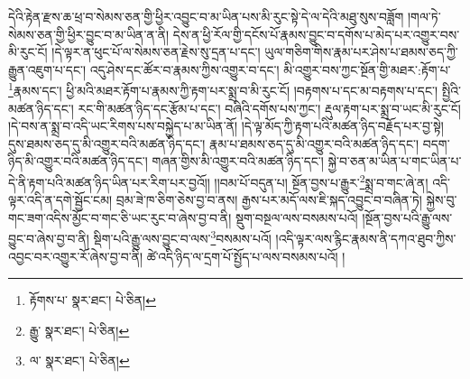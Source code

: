 དེའི་རྟེན་རྫས་ཆ་ཕྲ་བ་སེམས་ཅན་གྱི་ཕྱིར་འབྱུང་བ་མ་ཡིན་པས་མི་རུང་སྟེ་དེ་ལ་དེའི་མཐུ་སུས་བཟློག །གལ་ཏེ་སེམས་ཅན་གྱི་ཕྱིར་བྱུང་བ་མ་ཡིན་ན་ནི། དེས་ན་ཕྱི་རོལ་གྱི་དངོས་པོ་རྣམས་བྱུང་བ་དགོས་པ་མེད་པར་འགྱུར་བས་མི་རུང་ངོ། །དེ་ལྟར་ན་ཕུང་པོ་ལ་སེམས་ཅན་རྗེས་སུ་དྲན་པ་དང་། ཡུལ་གཅིག་གིས་རྣམ་པར་ཤེས་པ་ཐམས་ཅད་ཀྱི་རྒྱུན་འཇུག་པ་དང་། འདུ་ཤེས་དང་ཚོར་བ་རྣམས་ཀྱིས་འགྱུར་བ་དང་། མི་འགྱུར་བས་ཀྱང་སྔོན་གྱི་མཐར་:རྟོག་པ་\footnote{རྟོགས་པ་  སྣར་ཐང་།  པེ་ཅིན། }རྣམས་དང་། ཕྱི་མའི་མཐར་རྟོག་པ་རྣམས་ཀྱི་རྟག་པར་སྨྲ་བ་མི་རུང་ངོ། །བརྟགས་པ་དང་མ་བརྟགས་པ་དང་། སྤྱིའི་མཚན་ཉིད་དང་། རང་གི་མཚན་ཉིད་དང་རྩོམ་པ་དང་། བཞིའི་དགོས་པས་ཀྱང་། རྡུལ་རྟག་པར་སྨྲ་བ་ཡང་མི་རུང་ངོ། །དེ་བས་ན་སྨྲ་བ་འདི་ཡང་རིགས་པས་བསྐྱེད་པ་མ་ཡིན་ནོ། །དེ་ལྟ་མོད་ཀྱི་རྟག་པའི་མཚན་ཉིད་བརྗོད་པར་བྱ་སྟེ། དུས་ཐམས་ཅད་དུ་མི་འགྱུར་བའི་མཚན་ཉིད་དང་། རྣམ་པ་ཐམས་ཅད་དུ་མི་འགྱུར་བའི་མཚན་ཉིད་དང་། བདག་ཉིད་མི་འགྱུར་བའི་མཚན་ཉིད་དང་། གཞན་གྱིས་མི་འགྱུར་བའི་མཚན་ཉིད་དང་། སྐྱེ་བ་ཅན་མ་ཡིན་པ་གང་ཡིན་པ་དེ་ནི་རྟག་པའི་མཚན་ཉིད་ཡིན་པར་རིག་པར་བྱའོ།། །།བམ་པོ་བདུན་པ། སྔོན་བྱས་པ་རྒྱུར་\footnote{རྒྱུ་  སྣར་ཐང་།  པེ་ཅིན། }སྨྲ་བ་གང་ཞེ་ན། འདི་ལྟར་འདི་ན་དགེ་སྦྱོང་ངམ། བྲམ་ཟེ་ཁ་ཅིག་ཅེས་བྱ་བ་ནས། རྒྱས་པར་མདོ་ལས་ཇི་སྐད་འབྱུང་བ་བཞིན་ཏེ། སྐྱེས་བུ་གང་ཟག་འདིས་མྱོང་བ་གང་ཅི་ཡང་རུང་བ་ཞེས་བྱ་བ་ནི། སྡུག་བསྔལ་ལས་བསམས་པའོ། །སྔོན་བྱས་པའི་རྒྱུ་ལས་བྱུང་བ་ཞེས་བྱ་བ་ནི། སྡིག་པའི་རྒྱུ་ལས་བྱུང་བ་ལས་\footnote{ལ་  སྣར་ཐང་།  པེ་ཅིན། }བསམས་པའོ། །འདི་ལྟར་ལས་རྙིང་རྣམས་ནི་དཀའ་ཐུབ་ཀྱིས་འབྱང་བར་འགྱུར་རོ་ཞེས་བྱ་བ་ནི། ཚེ་འདི་ཉིད་ལ་དྲག་པོ་སྤྱོད་པ་ལས་བསམས་པའོ། །
